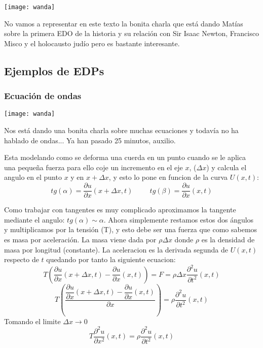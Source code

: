 \documentclass[openany]{book}
\begin{document}
\begin{minipage}[l]{0.1\textwidth}
  \texttt{[image: wanda]}
\end{minipage}
\begin{minipage}[l]{0.8\textwidth}
  No vamos a representar en este texto la bonita charla que está dando Matías sobre la primera EDO de la historia y su relación con Sir Isaac Newton, Francisco Misco y el holocausto judío pero es bastante interesante.
\end{minipage}

\subsection{Ejemplos de EDPs}
\subsubsection{Ecuación de ondas}
\begin{minipage}[l]{0.1\textwidth}
  \texttt{[image: wanda]}
\end{minipage}
\begin{minipage}[l]{0.8\textwidth}
  Nos está dando una bonita charla sobre muchas ecuaciones y todavía no ha hablado de ondas... Ya han pasado 25 minutos, auxilio.
\end{minipage}


Esta modelando como se deforma una cuerda en un punto cuando se le aplica una pequeña fuerza para ello coje un incremento en el eje $x$, ($\Delta x$) y calcula el angulo en el punto $x$ y en $x + \Delta x$, y esto lo pone en funcion de la curva $U(x,t)$:
$$tg(\alpha) = \dfrac{\partial u}{\partial x} (x + \Delta x, t) \hspace{1cm} tg(\beta) = \dfrac{\partial u}{\partial x}(x,t)$$

Como trabajar con tangentes es muy complicado aproximamos la tangente mediante el angulo: $tg(\alpha) \sim \alpha$.
Ahora simplemente restamos estos dos ángulos y multiplicamos por la tensión (T), y esto debe ser una fuerza que como sabemos es masa por aceleración. La masa viene dada por $\rho \Delta x$
donde $\rho$ es la densidad de masa por longitud (constante). La aceleracion es la derivada segunda de $U(x,t)$ respecto de $t$ quedando por tanto la siguiente ecuacion:
$$ T\left(\dfrac{\partial u}{\partial x} (x + \Delta x, t) - \dfrac{\partial u}{\partial x}(x,t) \right) = F =  \rho \Delta x \dfrac{\partial ^2 u}{\partial t ^2}(x,t)  $$
$$ T\left(\dfrac{\dfrac{\partial u}{\partial x} (x + \Delta x, t) - \dfrac{\partial u}{\partial x}(x,t)}{\partial x}\right) = \rho \dfrac{\partial ^2 u}{\partial t^2} (x,t)$$
Tomando el limite $ \Delta x \to 0 $
$$ T \dfrac{\partial ^2 u}{\partial x ^2}(x,t) = \rho \dfrac{\partial ^2 u}{\partial t ^2}(x,t)   $$
\end{document}
